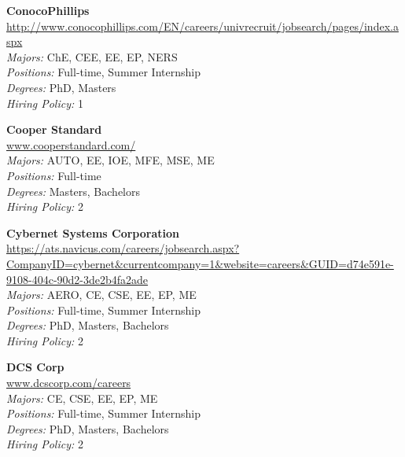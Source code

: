 \documentclass{article}
\begin{document}
\begin{center}
\begin{multicols}{3}
\begin{minipage}{.9\columnwidth}{\Large\bf ConocoPhillips }\\
	\url{http://www.conocophillips.com/EN/careers/univrecruit/jobsearch/pages/index.aspx}\\
	\emph{Majors:} ChE, CEE, EE, EP, NERS\\
	\emph{Positions:} Full-time, Summer Internship\\
	\emph{Degrees:} PhD, Masters\\
	\emph{Hiring Policy:} 1\\
\end{minipage}
 
\begin{minipage}{.9\columnwidth}{\Large\bf Cooper Standard }\\
	\url{www.cooperstandard.com/}\\
	\emph{Majors:} AUTO, EE, IOE, MFE, MSE, ME\\
	\emph{Positions:} Full-time\\
	\emph{Degrees:} Masters, Bachelors\\
	\emph{Hiring Policy:} 2\\
\end{minipage}
 
\begin{minipage}{.9\columnwidth}{\Large\bf Cybernet Systems Corporation }\\
	\url{https://ats.navicus.com/careers/jobsearch.aspx?CompanyID=cybernet&currentcompany=1&website=careers&GUID=d74e591e-9108-404c-90d2-3de2b4fa2ade}\\
	\emph{Majors:} AERO, CE, CSE, EE, EP, ME\\
	\emph{Positions:} Full-time, Summer Internship\\
	\emph{Degrees:} PhD, Masters, Bachelors\\
	\emph{Hiring Policy:} 2\\
\end{minipage}
 
\begin{minipage}{.9\columnwidth}{\Large\bf DCS Corp }\\
	\url{www.dcscorp.com/careers}\\
	\emph{Majors:} CE, CSE, EE, EP, ME\\
	\emph{Positions:} Full-time, Summer Internship\\
	\emph{Degrees:} PhD, Masters, Bachelors\\
	\emph{Hiring Policy:} 2\\
\end{minipage}
 

\end{multicols}
\end{center}
\end{document}
